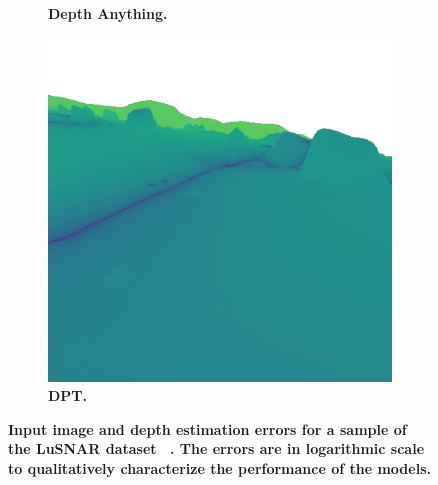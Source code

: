 \begin{figure}[b!]
\begin{subfigure}[b]{0.16\textwidth}
		\caption{\bfseries Depth Anything.}
	\end{subfigure}\hfill
	\begin{subfigure}[b]{0.16\textwidth}
		\includegraphics[width=\textwidth]{figures/depth_error_DPT.png}
		\caption{\bfseries DPT.}
	\end{subfigure}
	\caption{\bfseries Input image and depth estimation errors for a sample of the LuSNAR dataset~\cite{liu_lusnarlunar_2024} . The errors are in logarithmic scale to qualitatively characterize the performance of the models.}
	\label{fig:depth_errors}
\end{figure}




